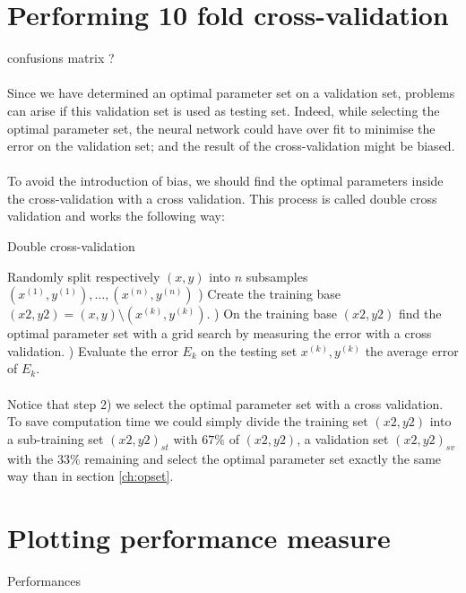\documentclass[a4paper,12pt,oneside,final]{report}
\begin{document}
\section{Performing 10 fold cross-validation}
{\color{red} confusions matrix ?}

\paragraph{}
Since we have determined an optimal parameter set on a validation set, problems can arise if this validation set is used as testing set. Indeed, while selecting the optimal parameter set, the neural network could have over fit to minimise the error on the validation set; and the result of the cross-validation might be biased.
\paragraph{}
To avoid the introduction of bias, we should find the optimal parameters inside the cross-validation with a cross validation. This process is called double cross validation and works the following way:
\begin{algorithm}[H]
\caption{Double cross-validation}
\label{al:dcv}
\begin{algorithmic}[1]
\STATE Randomly split respectively $(x, y)$ into $n$ subsamples $(x^{(1)}, y^{(1)}),\hdots,(x^{(n)}, y^{(n)})$
    ) Create the training base $(x2,y2)=(x, y)\setminus(x^{(k)}, y^{(k)})$.
    ) On the training base $(x2,y2)$ find the optimal parameter set with a grid search by measuring the error with a cross validation.
    ) Evaluate the error $E_k$ on the testing set $x^{(k)}, y^{(k)}$
\ENDFOR
{} the average error of $E_k$.
\end{algorithmic}
\end{algorithm}
\paragraph{}
Notice that step 2) we select the optimal parameter set with a cross validation. To save computation time we could simply divide the training set $(x2,y2)$ into a sub-training set $(x2,y2)_{st}$ with $67\%$ of $(x2,y2)$, a validation set $(x2,y2)_{sv}$ with the $33\%$ remaining and select the optimal parameter set exactly the same way than in section \ref{ch:opset}.

\section{Plotting performance measure}
{\color{red} Performances}
\end{document}
